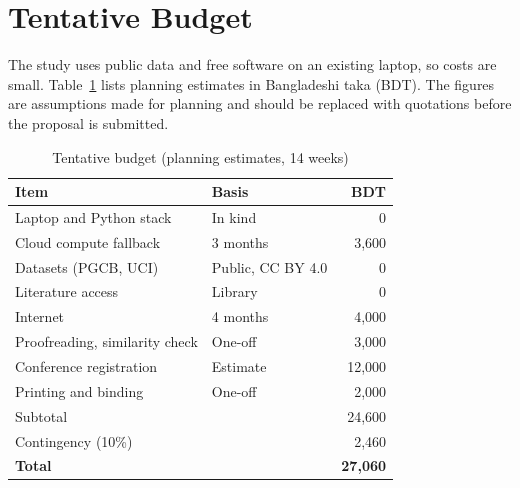 \documentclass[10pt,a4paper]{article}
\begin{document}
\section{Tentative Budget}
The study uses public data and free software on an existing laptop, so costs are small. Table~\ref{tab:budget} lists planning estimates in Bangladeshi taka (BDT). The figures are assumptions made for planning and should be replaced with quotations before the proposal is submitted.

\begin{table}[H]
\caption{Tentative budget (planning estimates, 14 weeks)}
\label{tab:budget}
\centering
\renewcommand{\arraystretch}{1.1}
\begin{tabular}{@{}l l r@{}}
\toprule
\textbf{Item} & \textbf{Basis} & \textbf{BDT} \\
\midrule
Laptop and Python stack & In kind & 0 \\
Cloud compute fallback & 3 months & 3{,}600 \\
Datasets (PGCB, UCI) & Public, CC BY 4.0 & 0 \\
Literature access & Library & 0 \\
Internet & 4 months & 4{,}000 \\
Proofreading, similarity check & One-off & 3{,}000 \\
Conference registration & Estimate & 12{,}000 \\
Printing and binding & One-off & 2{,}000 \\
\midrule
Subtotal & & 24{,}600 \\
Contingency (10\%) & & 2{,}460 \\
\midrule
\textbf{Total} & & \textbf{27{,}060} \\
\bottomrule
\end{tabular}
\end{table}

\end{document}
